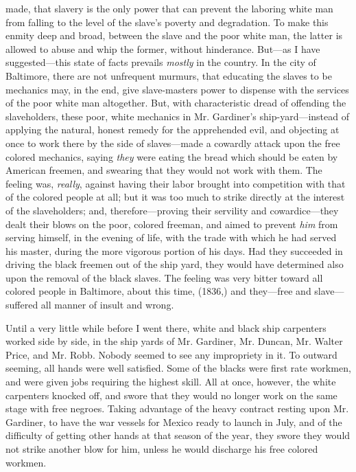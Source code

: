 made, that slavery is the only power that can prevent the laboring white
man from falling to the level of the slave's poverty and
{\protect\hypertarget{311}{}{}}degradation. To make this enmity deep and
broad, between the slave and the poor white man, the latter is allowed
to abuse and whip the former, without hinderance. But---as I have
suggested---this state of facts prevails \emph{mostly} in the country.
In the city of Baltimore, there are not unfrequent murmurs, that
educating the slaves to be mechanics may, in the end, give slave-masters
power to dispense with the services of the poor white man altogether.
But, with characteristic dread of offending the slaveholders, these
poor, white mechanics in Mr. Gardiner's ship-yard---instead of applying
the natural, honest remedy for the apprehended evil, and objecting at
once to work there by the side of slaves---made a cowardly attack upon
the free colored mechanics, saying \emph{they} were eating the bread
which should be eaten by American freemen, and swearing that they would
not work with them. The feeling was, \emph{really}, against having their
labor brought into competition with that of the colored people at all;
but it was too much to strike directly at the interest of the
slaveholders; and, therefore---proving their servility and
cowardice---they dealt their blows on the poor, colored freeman, and
aimed to prevent \emph{him} from serving himself, in the evening of
life, with the trade with which he had served his master, during the
more vigorous portion of his days. Had they succeeded in driving the
black freemen out of the ship yard, they would have determined also upon
the removal of the black slaves. The feeling was very bitter toward all
colored people in Baltimore, about this time, (1836,) and they---free
and slave---suffered all manner of insult and wrong.

{\protect\hypertarget{312}{}{}}Until a very little while before I went
there, white and black ship carpenters worked side by side, in the ship
yards of Mr. Gardiner, Mr. Duncan, Mr. Walter Price, and Mr. Robb.
Nobody seemed to see any impropriety in it. To outward seeming, all
hands were well satisfied. Some of the blacks were first rate workmen,
and were given jobs requiring the highest skill. All at once, however,
the white carpenters knocked off, and swore that they would no longer
work on the same stage with free negroes. Taking advantage of the heavy
contract resting upon Mr. Gardiner, to have the war vessels for Mexico
ready to launch in July, and of the difficulty of getting other hands at
that season of the year, they swore they would not strike another blow
for him, unless he would discharge his free colored workmen.

